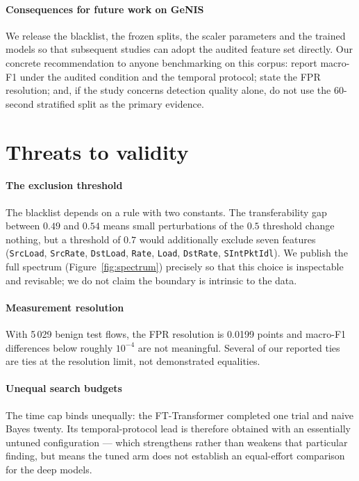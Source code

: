 \documentclass[review,12pt]{elsarticle}
\begin{document}
\paragraph{Consequences for future work on GeNIS}
We release the blacklist, the frozen splits, the scaler parameters and the trained models
so that subsequent studies can adopt the audited feature set directly. Our concrete
recommendation to anyone benchmarking on this corpus: report macro-F1 under the audited
condition and the temporal protocol; state the FPR resolution; and, if the study concerns
detection quality alone, do not use the 60-second stratified split as the primary
evidence.

\section{Threats to validity}
\label{sec:threats}

\paragraph{The exclusion threshold}
The blacklist depends on a rule with two constants. The transferability gap between
$0.49$ and $0.54$ means small perturbations of the $0.5$ threshold change nothing, but a
threshold of $0.7$ would additionally exclude seven features
(\texttt{SrcLoad}, \texttt{SrcRate}, \texttt{DstLoad}, \texttt{Rate}, \texttt{Load},
\texttt{DstRate}, \texttt{SIntPktIdl}). We publish the full spectrum
(Figure~\ref{fig:spectrum}) precisely so that this choice is inspectable and revisable;
we do not claim the boundary is intrinsic to the data.

\paragraph{Measurement resolution}
With 5\,029 benign test flows, the FPR resolution is 0.0199 points and macro-F1
differences below roughly $10^{-4}$ are not meaningful. Several of our reported ties are
ties at the resolution limit, not demonstrated equalities.

\paragraph{Unequal search budgets}
The time cap binds unequally: the FT-Transformer completed one trial and naive Bayes
twenty. Its temporal-protocol lead is therefore obtained with an essentially untuned
configuration --- which strengthens rather than weakens that particular finding, but
means the tuned arm does not establish an equal-effort comparison for the deep models.
\end{document}
